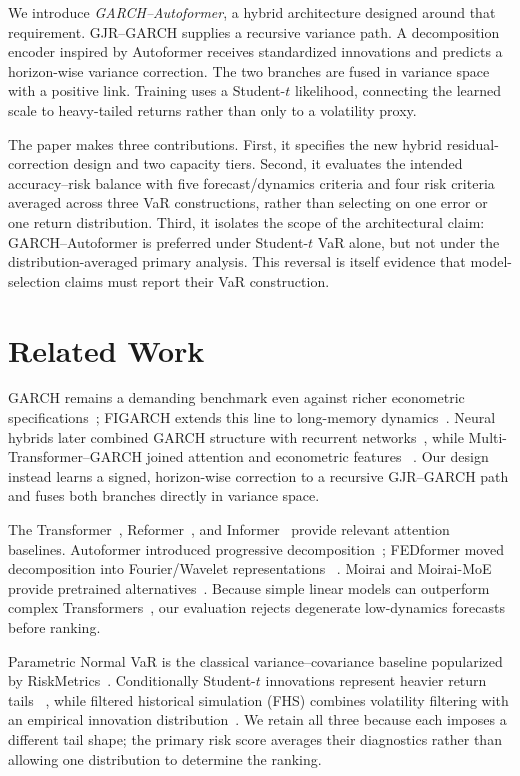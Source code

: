 \documentclass[runningheads]{llncs}
\begin{document}
We introduce \emph{GARCH--Autoformer}, a hybrid architecture designed
around that requirement. GJR--GARCH supplies a recursive variance path.
A decomposition encoder inspired by Autoformer receives standardized
innovations and predicts a horizon-wise variance correction. The two
branches are fused in variance space with a positive link. Training uses
a Student-\(t\) likelihood, connecting the learned scale to heavy-tailed
returns rather than only to a volatility proxy.

The paper makes three contributions. First, it specifies the new hybrid
residual-correction design and two capacity tiers. Second, it evaluates
the intended accuracy--risk balance with five forecast/dynamics
criteria and four risk criteria averaged across three VaR
constructions, rather than selecting on one error or one return
distribution. Third, it isolates the scope of the architectural claim:
GARCH--Autoformer is preferred under Student-\(t\) VaR alone, but not
under the distribution-averaged primary analysis. This reversal is
itself evidence that model-selection claims must report their VaR
construction.

\section{Related Work}

GARCH remains a demanding benchmark even against richer econometric
specifications~\cite{hansen2005}; FIGARCH extends this line to
long-memory dynamics~\cite{baillie1996}. Neural hybrids later combined
GARCH structure with recurrent networks~\cite{zhao2024}, while
Multi-Transformer--GARCH joined attention and econometric features
~\cite{mishra2024}. Our design instead learns a signed, horizon-wise
correction to a recursive GJR--GARCH path and fuses both branches
directly in variance space.

The Transformer~\cite{vaswani2017}, Reformer~\cite{kitaev2020}, and
Informer~\cite{informer2021} provide relevant attention baselines.
Autoformer introduced progressive decomposition~\cite{wu2021};
FEDformer moved decomposition into Fourier/Wavelet representations
~\cite{fedformer2022}. Moirai and Moirai-MoE provide pretrained
alternatives~\cite{woo2024,liu2025}. Because simple linear models can
outperform complex Transformers~\cite{zeng2023}, our evaluation rejects
degenerate low-dynamics forecasts before ranking.

Parametric Normal VaR is the classical variance--covariance baseline
popularized by RiskMetrics~\cite{riskmetrics1996}. Conditionally
Student-\(t\) innovations represent heavier return tails
~\cite{bollerslev1987}, while filtered historical simulation (FHS)
combines volatility filtering with an empirical innovation
distribution~\cite{baroneadesi1999}. We retain all three because each
imposes a different tail shape; the primary risk score averages their
diagnostics rather than allowing one distribution to determine the
ranking.
\end{document}
